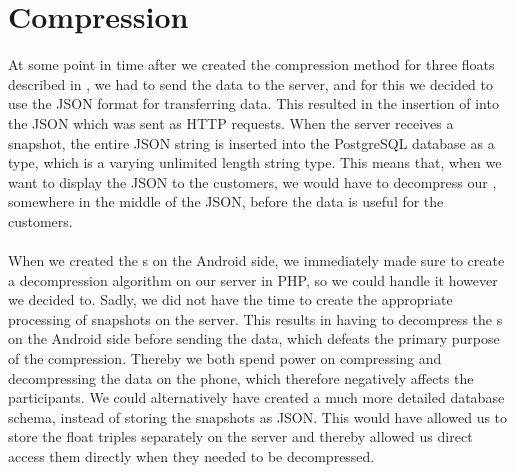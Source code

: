 
\section{Compression}
\label{sec:reflection_compression}

At some point in time after we created the compression method for three floats described in , we had to send the data to the server, and for this we decided to use the JSON format for transferring data. This resulted in the insertion of  into the JSON which was sent as HTTP requests. When the server receives a snapshot, the entire JSON string is inserted into the PostgreSQL database as a  type, which is a varying unlimited length string type. This means that, when we want to display the JSON to the customers, we would have to decompress our , somewhere in the middle of the JSON, before the data is useful for the customers.
\\\\
When we created the s on the Android side, we immediately made sure to create a decompression algorithm on our server in PHP, so we could handle it however we decided to. Sadly, we did not have the time to create the appropriate processing of snapshots on the server. This results in having to decompress the s on the Android side before sending the data, which defeats the primary purpose of the compression. Thereby we both spend power on compressing and decompressing the data on the phone,  which therefore negatively affects the participants. We could alternatively have created a much more detailed database schema, instead of storing the snapshots as JSON. This would have allowed us to store the float triples separately on the server and thereby allowed us direct access them directly when they needed to be decompressed.


